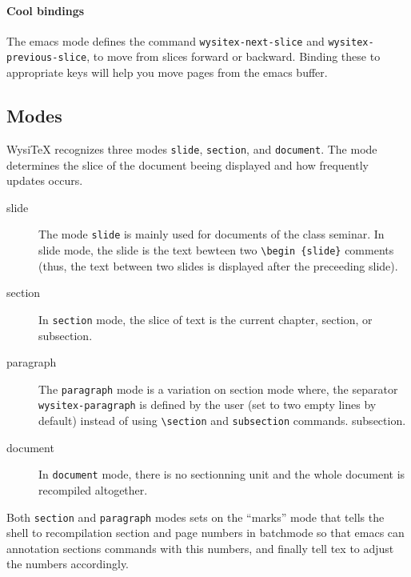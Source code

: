 \documentclass{article}
\let \lst \verb
\begin{document}
\paragraph {Cool bindings}
The emacs mode defines the command \lst"wysitex-next-slice" and
\lst"wysitex-previous-slice", to move from slices forward or backward.
Binding these to appropriate keys will help you move pages from the emacs
buffer. 


\subsection {Modes}%

WysiTeX recognizes three modes \lst"slide", \lst"section", and \lst"document". 
The mode determines the slice of the document beeing displayed and how
frequently updates occurs. 
\begin{description}

\item [slide]

The mode \lst"slide"  is mainly used for documents of the class seminar. 
In slide mode, the slide is the text bewteen two \lst"\begin {slide}"
comments (thus,  the text between two slides is displayed after the
preceeding slide).  

\item [section]
In \lst"section" mode, the slice of text is the current chapter, section, or
subsection.

\item [paragraph]
The \lst"paragraph" mode is a variation on section mode where, the separator
\lst"wysitex-paragraph" is defined by the user (set to two empty lines by
default) instead of using \lst"\section"  and \lst"subsection" commands. 
subsection.

\item [document]
In \lst"document" mode, there is no sectionning unit and the whole document is
recompiled altogether.

\end{description}
Both \lst"section" and \lst"paragraph" modes sets on the ``marks'' mode
that tells the shell to recompilation section and page numbers in batchmode
so that emacs can annotation sections commands with this numbers, and
finally tell tex to adjust the numbers accordingly.
\end{document}
